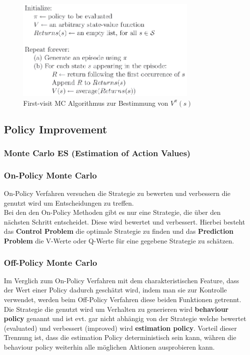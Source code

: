\documentclass[10pt]{scrartcl}
\begin{document}
\begin{figure}[htbp]
	\centering	\includegraphics[width=0.8\textwidth]{Bilder/First-visit_MC.png}
	\caption{First-visit MC Algorithmus zur Bestimmung von $V^{\pi}(s)$}
	\label{fig:FirstVisit}
\end{figure}

\subsection{Policy Improvement}
\subsubsection{Monte Carlo ES (Estimation of Action Values)}


\subsubsection{On-Policy Monte Carlo}
On-Policy Verfahren versuchen die Strategie zu bewerten und verbessern die genutzt wird um Entscheidungen zu treffen.\\
Bei den den On-Policy Methoden gibt es nur eine Strategie, die über den nächsten Schritt entscheidet. Diese wird bewertet und verbessert. Hierbei besteht das \textbf{Control Problem} die optimale Strategie zu finden und das \textbf{Prediction Problem} die V-Werte oder Q-Werte für eine gegebene Strategie zu schätzen. 

\subsubsection{Off-Policy Monte Carlo}
Im Verglich zum On-Policy Verfahren mit dem charakteristischen Feature, dass der Wert einer Policy dadurch geschätzt wird, indem man sie zur Kontrolle verwendet, werden beim Off-Policy Verfahren diese beiden Funktionen getrennt.\\
Die Strategie die genutzt wird um Verhalten zu generieren wird \textbf{behaviour policy} genannt und ist evt. gar nicht abhängig von der Strategie welche bewertet (evaluated) und verbessert (improved) wird  \textbf{estimation policy}. Vorteil dieser Trennung ist, dass die estimation Policy deterministisch sein kann, währen die behaviour policy weiterhin alle möglichen Aktionen ausprobieren kann.
\end{document}

